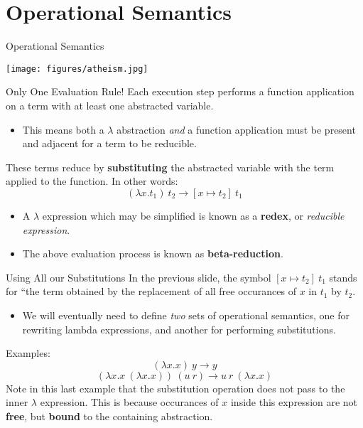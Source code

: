 \documentclass[11pt]{beamer}
\begin{document}
\section[Semantics]{Operational Semantics}
\begin{frame}[fragile=singleslide]{Operational Semantics}
\begin{center}
\texttt{[image: figures/atheism.jpg]}
\end{center}
\end{frame}

\begin{frame}[fragile=singleslide]{Only One Evaluation Rule!}
Each execution step performs a function application on a term with at least one abstracted variable.  
\begin{itemize}
\item This means both a $\lambda$ abstraction \emph{and} a function application must be present and adjacent for a term to be reducible.  
\end{itemize}
These terms reduce by \textbf{substituting} the abstracted variable with the term applied to the function.  In other words:
\begin{equation}
(\lambda x. t_1)\:t_2 \rightarrow [x \mapsto t_2]\:t_1
\end{equation}
\begin{itemize}
\item A $\lambda$ expression which may be simplified is known as a \textbf{redex}, or \emph{reducible expression}.
\item The above evaluation process is known as \textbf{beta-reduction}.
\end{itemize}

\end{frame}

\begin{frame}[fragile=singleslide]{Using All our Substitutions}
In the previous slide, the symbol $[x \mapsto t_2]\:t_1$ stands for ``the term obtained by the replacement of all free occurances of $x$ in $t_1$ by $t_2$.
\begin{itemize}
\item We will eventually need to define \emph{two} sets of operational semantics, one for rewriting lambda expressions, and another for performing substitutions.  
\end{itemize}
Examples:
\begin{equation}
(\lambda x.x)\: y \rightarrow y
\end{equation}
\begin{equation}
(\lambda x . x\:(\lambda x . x))\:(u\:r) \rightarrow u\:r\:(\lambda x . x)
\end{equation}
Note in this last example that the substitution operation does not pass to the inner $\lambda$ expression.  This is because occurances of $x$ inside this expression are not \textbf{free}, but \textbf{bound} to the containing abstraction.  
\end{frame}
\end{document}
